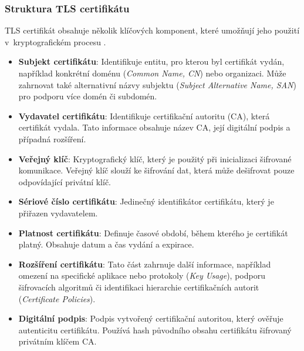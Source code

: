 \subsubsection*{Struktura TLS certifikátu}
TLS certifikát obsahuje několik klíčových komponent, které umožňují jeho použití v~kryptografickém procesu \cite{cooper2008x509, cabforum_tls}.
\begin{itemize}
    \item \textbf{Subjekt certifikátu}: Identifikuje entitu, pro kterou byl certifikát vydán, například konkrétní doménu (\emph{Common Name, CN}) nebo organizaci. Může zahrnovat také alternativní názvy subjektu (\emph{Subject Alternative Name, SAN}) pro podporu více domén či subdomén.
    \item \textbf{Vydavatel certifikátu}: Identifikuje certifikační autoritu (CA), která certifikát vydala. Tato informace obsahuje název CA, její digitální podpis a případná rozšíření.
    \item \textbf{Veřejný klíč}: Kryptografický klíč, který je použitý při inicializaci šifrované komunikace. Veřejný klíč slouží ke šifrování dat, která může dešifrovat pouze odpovídající privátní klíč.
    \item \textbf{Sériové číslo certifikátu}: Jedinečný identifikátor certifikátu, který je přiřazen vydavatelem.
    \item \textbf{Platnost certifikátu}: Definuje časové období, během kterého je certifikát platný. Obsahuje datum a čas vydání a expirace.
    \item \textbf{Rozšíření certifikátu}: Tato část zahrnuje další informace, například omezení na specifické aplikace nebo protokoly (\emph{Key Usage}), podporu šifrovacích algoritmů či identifikaci hierarchie certifikačních autorit (\emph{Certificate Policies}).
    \item \textbf{Digitální podpis}: Podpis vytvořený certifikační autoritou, který ověřuje autenticitu certifikátu. Používá hash původního obsahu certifikátu šifrovaný privátním klíčem CA.
\end{itemize}

